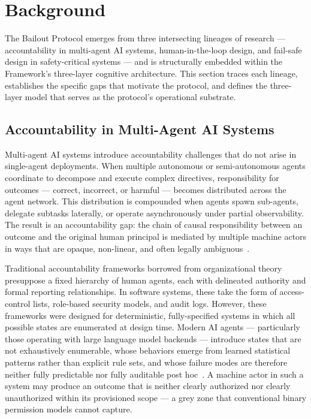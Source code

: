 \section{Background}
\label{sec:background}

The Bailout Protocol emerges from three intersecting lineages of research — accountability in multi-agent AI systems, human-in-the-loop design, and fail-safe design in safety-critical systems — and is structurally embedded within the \bxthree{} Framework's three-layer cognitive architecture. This section traces each lineage, establishes the specific gaps that motivate the protocol, and defines the three-layer model that serves as the protocol's operational substrate.

\subsection{Accountability in Multi-Agent AI Systems}
\label{sec:accountability}

Multi-agent AI systems introduce accountability challenges that do not arise in single-agent deployments. When multiple autonomous or semi-autonomous agents coordinate to decompose and execute complex directives, responsibility for outcomes — correct, incorrect, or harmful — becomes distributed across the agent network. This distribution is compounded when agents spawn sub-agents, delegate subtasks laterally, or operate asynchronously under partial observability. The result is an accountability gap: the chain of causal responsibility between an outcome and the original human principal is mediated by multiple machine actors in ways that are opaque, non-linear, and often legally ambiguous~\cite{bansal2019}.

Traditional accountability frameworks borrowed from organizational theory presuppose a fixed hierarchy of human agents, each with delineated authority and formal reporting relationships. In software systems, these take the form of access-control lists, role-based security models, and audit logs. However, these frameworks were designed for deterministic, fully-specified systems in which all possible states are enumerated at design time. Modern AI agents — particularly those operating with large language model backends — introduce states that are not exhaustively enumerable, whose behaviors emerge from learned statistical patterns rather than explicit rule sets, and whose failure modes are therefore neither fully predictable nor fully auditable post hoc~\cite{dijkstra1982}. A machine actor in such a system may produce an outcome that is neither clearly authorized nor clearly unauthorized within its provisioned scope — a grey zone that conventional binary permission models cannot capture.

